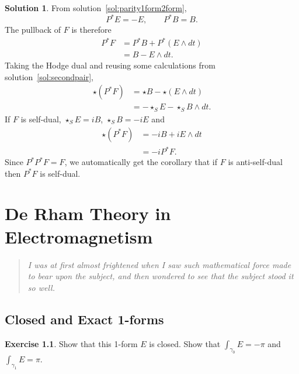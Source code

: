 \documentclass[11pt, a4paper]{report}
\theoremstyle{definition}
\newtheorem{ex}{Exercise}[part]
\newtheorem{sol}{Solution}[part]
\newenvironment{epigraph}
    {\begin{quote}\small\itshape} %
    {\end{quote}\ignorespacesafterend\vspace{\parskip}}
\begin{document}
\begin{sol}

From solution~\ref{sol:parity1form2form},
\[
    P^* E = -E, \qquad
    P^* B = B.
\]
The pullback of $F$ is therefore
\begin{align*}
    P^* F &= P^* B + P^* (E \wedge dt) \\
          &= B - E \wedge dt.
\end{align*}
Taking the Hodge dual and reusing some calculations from solution~\ref{sol:secondpair},
\begin{align*}
    \star(P^* F) &= \star B - \star(E \wedge dt) \\
                 &= -\star_S E - \star_S B \wedge dt.
\end{align*}
If $F$ is self-dual, $\star_S E = iB$, $\star_S B = -i E$ and
\begin{align*}
    \star(P^* F) &= -iB + iE \wedge dt \\
                 &= -i P^* F.
\end{align*}
Since $P^* P^* F = F$, we automatically get the corollary that if $F$ is anti-self-dual then $P^* F$ is self-dual.

\end{sol}

\chapter{De Rham Theory in Electromagnetism}

\begin{epigraph}
    I was at first almost frightened when I saw such mathematical force made to bear upon the subject, and then wondered to see that the subject stood it so well.
\end{epigraph}

\section{Closed and Exact 1-forms}

\begin{ex}

Show that this 1-form $E$ is closed. Show that $\int_{\gamma_0} E = -\pi$ and $\int_{\gamma_1} E = \pi$.

\end{ex}
\end{document}
